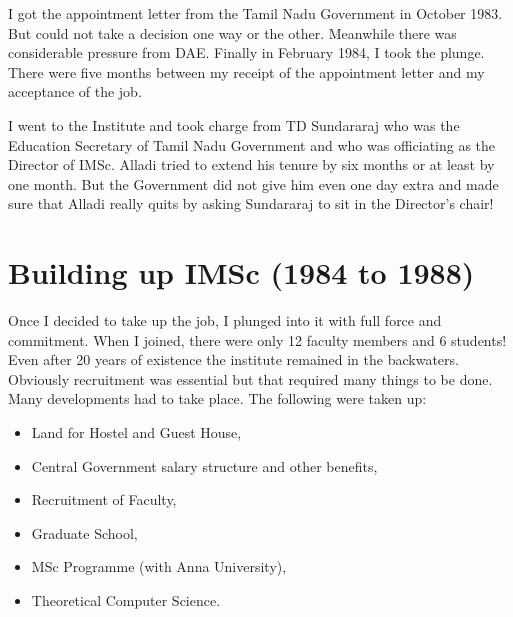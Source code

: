 I got the appointment letter from the Tamil Nadu Government in October 
1983. But could not take a decision one way or the other. Meanwhile 
there was considerable pressure from DAE. Finally in February 1984, I 
took the plunge. There were five months between my receipt of the 
appointment letter and my acceptance of the job.

I went to the Institute and took charge from TD Sundararaj who was the 
Education Secretary of Tamil Nadu Government and who was officiating as 
the Director of IMSc. Alladi tried to extend his tenure by six months or 
at least by one month. But the Government did not give him even one day 
extra and made sure that Alladi really quits by asking Sundararaj to sit 
in the Director's chair!

 

\section*{Building up IMSc (1984 to 1988)}

Once I decided to take up the job, I plunged into it with full force and 
commitment. When I joined, there were only 12 faculty members and 6 
students! Even after 20 years of existence the institute remained in the 
backwaters. Obviously recruitment was essential but that required many 
things to be done. Many developments had to take place. The following 
were taken up:
\begin{itemize}
\item Land for Hostel and Guest House, 
\item Central Government salary structure and other benefits, 
\item Recruitment of Faculty, 
\item Graduate School, 
\item MSc Programme (with Anna University), 
\item Theoretical Computer Science.
\end{itemize}

